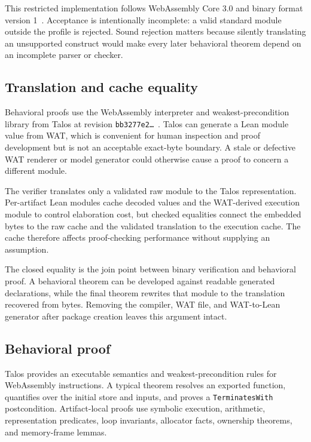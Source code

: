 \documentclass[11pt]{article}
\newcommand{\code}[1]{\texttt{#1}}
\begin{document}
This restricted implementation follows WebAssembly Core 3.0 and binary format version 1~\cite{WasmCore30}.  Acceptance is intentionally incomplete: a valid standard module outside the profile is rejected.  Sound rejection matters because silently translating an unsupported construct would make every later behavioral theorem depend on an incomplete parser or checker.

\subsection{Translation and cache equality}

Behavioral proofs use the WebAssembly interpreter and weakest-precondition library from Talos at revision \code{bb3277e2\ldots}~\cite{TalosSoftware}.  Talos can generate a Lean module value from WAT, which is convenient for human inspection and proof development but is not an acceptable exact-byte boundary.  A stale or defective WAT renderer or model generator could otherwise cause a proof to concern a different module.

The verifier translates only a validated raw module to the Talos representation.  Per-artifact Lean modules cache decoded values and the WAT-derived execution module to control elaboration cost, but checked equalities connect the embedded bytes to the raw cache and the validated translation to the execution cache.  The cache therefore affects proof-checking performance without supplying an assumption.

The closed equality is the join point between binary verification and behavioral proof.  A behavioral theorem can be developed against readable generated declarations, while the final theorem rewrites that module to the translation recovered from bytes.  Removing the compiler, WAT file, and WAT-to-Lean generator after package creation leaves this argument intact.

\subsection{Behavioral proof}

Talos provides an executable semantics and weakest-precondition rules for WebAssembly instructions.  A typical theorem resolves an exported function, quantifies over the initial store and inputs, and proves a \code{TerminatesWith} postcondition.  Artifact-local proofs use symbolic execution, arithmetic, representation predicates, loop invariants, allocator facts, ownership theorems, and memory-frame lemmas.
\end{document}
